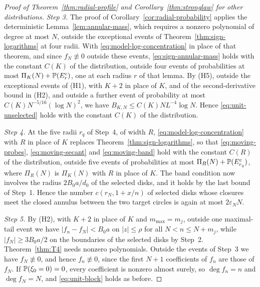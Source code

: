 \begin{proof}[Proof of Theorem~\ref{thm:radial-profile} and Corollary~\ref{thm:stronglaw} for other distributions]
\emph{Step 3.}
The proof of Corollary~\ref{cor:radial-probability} applies the
deterministic Lemma~\ref{lem:annular-mass}, which requires a nonzero
polynomial of degree at most $N$, outside the exceptional events of
Theorem~\ref{thm:sign-logarithms} at four radii.
With \eqref{eq:model-log-concentration} in place of that theorem, and
since $f_N\not\equiv0$ outside these events,
\eqref{eq:sign-annular-mass} holds with the constant $C(K)$ of the
distribution, outside four events of probabilities at most
$\Pi_K(N)+\mathbb P(E_r^c)$, one at each radius $r$ of that lemma.
By (H5), outside the exceptional events of (H1), with $K+2$ in place of
$K$, and of the second-derivative bound in (H2), and outside a further
event of probability at most $C(K)N^{-5/16}(\log N)^2$, we have
$B_{K,N}\le C(K)NL^{-4}\log N$.
Hence \eqref{eq:unit-unselected} holds with the constant $C(K)$ of the
distribution.

\emph{Step 4.}
At the five radii $r_q$ of Step~4, of width $R$,
\eqref{eq:model-log-concentration} with $R$ in place of $K$ replaces
Theorem~\ref{thm:sign-logarithms}, so that \eqref{eq:moving-probes},
\eqref{eq:moving-secant} and \eqref{eq:moving-band} hold with the constant
$C(R)$ of the distribution, outside five events of probabilities at most
$\Pi_R(N)+\mathbb P(E_{r_q}^c)$, where $\Pi_R(N)$ is $\Pi_K(N)$ with $R$ in
place of $K$.
The band condition now involves the radius $2B_0a/d_0$ of the selected
disks, and it holds by the last bound of Step~1. Hence the number
$c(r_N,1+x/n)$ of selected disks whose closures meet the closed annulus
between the two target circles is again at most $2\varepsilon_NN$.

\emph{Step 5.}
By (H2), with $K+2$ in place of $K$ and $m_{\max}=m_j$, outside one
maximal-tail event we have $|f_n-f_N|<B_0a$ on $|z|\le\rho$ for all
$N<n\le N+m_j$, while $|f_N|\ge3B_0a/2$ on the boundaries of the selected
disks by Step~2.
Theorem~\ref{thm:T4} needs nonzero polynomials. Outside the events of
Step~3 we have $f_N\not\equiv0$, and hence $f_n\not\equiv0$, since the
first $N+1$ coefficients of $f_n$ are those of $f_N$.
If $\mathbb P(\xi_0=0)=0$, every coefficient is nonzero almost surely, so
$\deg f_n=n$ and $\deg f_N=N$, and \eqref{eq:unit-block} holds as
before.


\end{proof}
